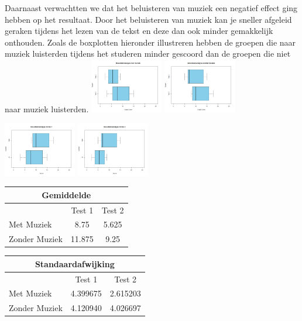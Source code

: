 \documentclass{hogent-article}
\begin{document}
	Daarnaast verwachtten we dat het beluisteren van muziek een negatief effect ging hebben op het resultaat. Door het beluisteren van muziek kan je sneller afgeleid geraken tijdens het lezen van de tekst en deze dan ook minder gemakkelijk onthouden. Zoals de boxplotten hieronder illustreren hebben de groepen die naar muziek luisterden tijdens het studeren minder gescoord dan de groepen die niet naar muziek luisterden.
	\includegraphics[width=120px]{Verwacht_Muziek}
	\includegraphics[width=120px]{Verwacht_ZonderMuziek}
	
	\includegraphics[width=120px]{Verwacht_Muziek_Score1}
	\includegraphics[width=120px]{Verwacht_Muziek_Score2}
	
	\begin{tabular}{ |p{10em}|c|c| }
	\hline
		\multicolumn{3}{|c|}{Gemiddelde} \\
	\hline
		& Test 1 & Test 2 \\
	\hline
		Met Muziek & 8.75  & 5.625 \\
		Zonder Muziek & 11.875 & 9.25 \\
	\hline
	\end{tabular}
	
	\begin{tabular}{ |p{10em}|c|c| }
	\hline
		\multicolumn{3}{|c|}{Standaardafwijking} \\
	\hline
		& Test 1 & Test 2 \\
	\hline
		Met Muziek & 4.399675  & 2.615203 \\
		Zonder Muziek & 4.120940 & 4.026697 \\
	\hline
	\end{tabular}
	
\end{document}
